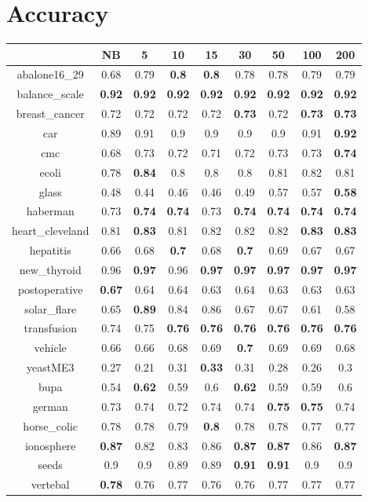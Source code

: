 \documentclass{article}%
\begin{document}
%
\normalsize%
\section*{Accuracy}%
\begin{tabular}{c|cccccccc}%
\hline%
&NB&5&10&15&30&50&100&200\\%
\hline%
abalone16\_29&0.68&0.79&\textbf{0.8}&\textbf{0.8}&0.78&0.78&0.79&0.79\\%
\hline%
balance\_scale&\textbf{0.92}&\textbf{0.92}&\textbf{0.92}&\textbf{0.92}&\textbf{0.92}&\textbf{0.92}&\textbf{0.92}&\textbf{0.92}\\%
\hline%
breast\_cancer&0.72&0.72&0.72&0.72&\textbf{0.73}&0.72&\textbf{0.73}&\textbf{0.73}\\%
\hline%
car&0.89&0.91&0.9&0.9&0.9&0.9&0.91&\textbf{0.92}\\%
\hline%
cmc&0.68&0.73&0.72&0.71&0.72&0.73&0.73&\textbf{0.74}\\%
\hline%
ecoli&0.78&\textbf{0.84}&0.8&0.8&0.8&0.81&0.82&0.81\\%
\hline%
glass&0.48&0.44&0.46&0.46&0.49&0.57&0.57&\textbf{0.58}\\%
\hline%
haberman&0.73&\textbf{0.74}&\textbf{0.74}&0.73&\textbf{0.74}&\textbf{0.74}&\textbf{0.74}&\textbf{0.74}\\%
\hline%
heart\_cleveland&0.81&\textbf{0.83}&0.81&0.82&0.82&0.82&\textbf{0.83}&\textbf{0.83}\\%
\hline%
hepatitis&0.66&0.68&\textbf{0.7}&0.68&\textbf{0.7}&0.69&0.67&0.67\\%
\hline%
new\_thyroid&0.96&\textbf{0.97}&0.96&\textbf{0.97}&\textbf{0.97}&\textbf{0.97}&\textbf{0.97}&\textbf{0.97}\\%
\hline%
postoperative&\textbf{0.67}&0.64&0.64&0.63&0.64&0.63&0.63&0.63\\%
\hline%
solar\_flare&0.65&\textbf{0.89}&0.84&0.86&0.67&0.67&0.61&0.58\\%
\hline%
transfusion&0.74&0.75&\textbf{0.76}&\textbf{0.76}&\textbf{0.76}&\textbf{0.76}&\textbf{0.76}&\textbf{0.76}\\%
\hline%
vehicle&0.66&0.66&0.68&0.69&\textbf{0.7}&0.69&0.69&0.68\\%
\hline%
yeastME3&0.27&0.21&0.31&\textbf{0.33}&0.31&0.28&0.26&0.3\\%
\hline%
bupa&0.54&\textbf{0.62}&0.59&0.6&\textbf{0.62}&0.59&0.59&0.6\\%
\hline%
german&0.73&0.74&0.72&0.74&0.74&\textbf{0.75}&\textbf{0.75}&0.74\\%
\hline%
horse\_colic&0.78&0.78&0.79&\textbf{0.8}&0.78&0.78&0.77&0.77\\%
\hline%
ionosphere&\textbf{0.87}&0.82&0.83&0.86&\textbf{0.87}&\textbf{0.87}&0.86&\textbf{0.87}\\%
\hline%
seeds&0.9&0.9&0.89&0.89&\textbf{0.91}&\textbf{0.91}&0.9&0.9\\%
\hline%
vertebal&\textbf{0.78}&0.76&0.77&0.76&0.76&0.77&0.77&0.77\\%
\hline%
\end{tabular}
\end{document}
